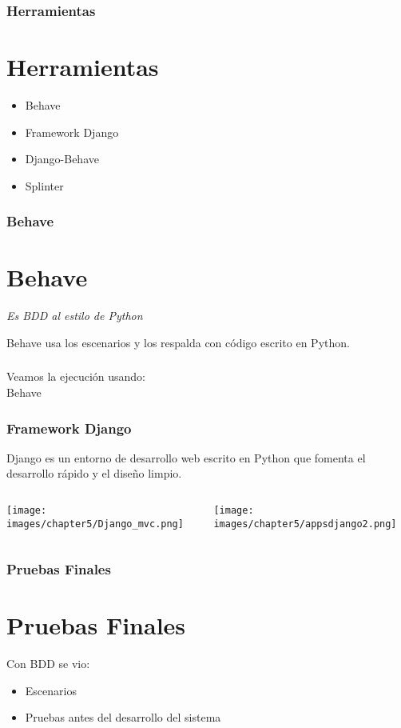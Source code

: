 \documentclass{beamer}
\begin{document}
\begin{frame}
  \frametitle{Herramientas}
  \section{Herramientas}
  \begin{itemize}
      \item Behave
      \item Framework Django
      \item Django-Behave
      \item Splinter
  \end{itemize}
\end{frame}

\begin{frame}
  \frametitle{Behave}
  \section{Behave}
  \begin{center}
    {\it Es BDD al estilo de Python}
  \end{center}
  Behave usa los escenarios y los respalda con c\'odigo escrito en Python.
\end{frame}

\begin{frame}
  \frametitle{}
  \begin{center}
    Veamos la ejecuci\'on usando:\\
    \vspace{1cm}
    {\huge Behave}
  \end{center}
\end{frame}

\begin{frame}
  \frametitle{Framework Django}
  Django es un entorno de desarrollo web escrito en Python que fomenta el
  desarrollo rápido y el diseño limpio.
  \begin{columns}

      \texttt{[image: images/chapter5/Django\_mvc.png]}

      \texttt{[image: images/chapter5/appsdjango2.png]}
  \end{columns}
\end{frame}

\begin{frame}
  \frametitle{Pruebas Finales}
  \section{Pruebas Finales}
  Con BDD se vio:
  \begin{itemize}
      \item Escenarios
      \item Pruebas antes del desarrollo del sistema
  \end{itemize}
\end{frame}
\end{document}
